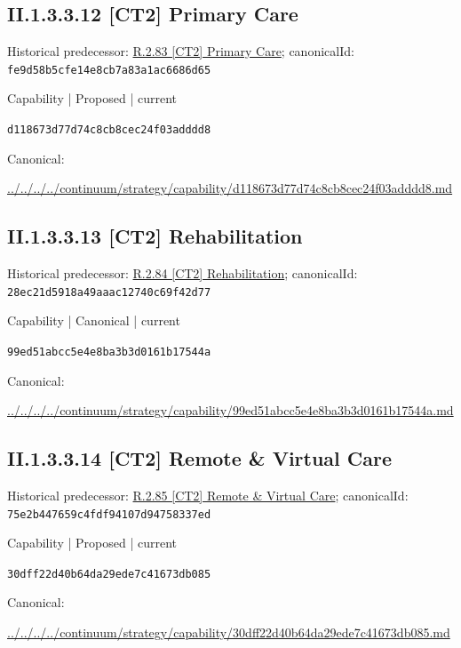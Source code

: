 \documentclass[10pt,a4paper]{article}
\begin{document}
\subsection*{II.1.3.3.12 [CT2] Primary Care}
Historical predecessor: \hyperref[element-fe9d58b5cfe14e8cb7a83a1ac6686d65]{R.2.83 [CT2] Primary Care}; canonicalId: \texttt{fe9d58b5cfe14e8cb7a83a1ac6686d65}\par
\label{element-d118673d77d74c8cb8cec24f03adddd8}
{\small Capability | Proposed | current}\par
\texttt{d118673d77d74c8cb8cec24f03adddd8}\par
Canonical: \par
{\footnotesize\url{../../../../continuum/strategy/capability/d118673d77d74c8cb8cec24f03adddd8.md}}\par
\subsection*{II.1.3.3.13 [CT2] Rehabilitation}
Historical predecessor: \hyperref[element-28ec21d5918a49aaac12740c69f42d77]{R.2.84 [CT2] Rehabilitation}; canonicalId: \texttt{28ec21d5918a49aaac12740c69f42d77}\par
\label{element-99ed51abcc5e4e8ba3b3d0161b17544a}
{\small Capability | Canonical | current}\par
\texttt{99ed51abcc5e4e8ba3b3d0161b17544a}\par
Canonical: \par
{\footnotesize\url{../../../../continuum/strategy/capability/99ed51abcc5e4e8ba3b3d0161b17544a.md}}\par
\subsection*{II.1.3.3.14 [CT2] Remote \& Virtual Care}
Historical predecessor: \hyperref[element-75e2b447659c4fdf94107d94758337ed]{R.2.85 [CT2] Remote \& Virtual Care}; canonicalId: \texttt{75e2b447659c4fdf94107d94758337ed}\par
\label{element-30dff22d40b64da29ede7c41673db085}
{\small Capability | Proposed | current}\par
\texttt{30dff22d40b64da29ede7c41673db085}\par
Canonical: \par
{\footnotesize\url{../../../../continuum/strategy/capability/30dff22d40b64da29ede7c41673db085.md}}\par
\end{document}
